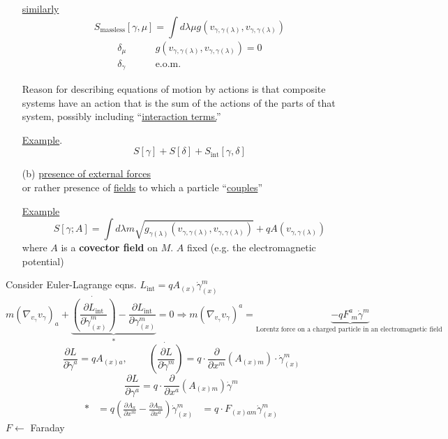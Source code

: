 \documentclass[10pt, twoside]{amsart}
\begin{document}
\begin{multicols*}{2}
\begin{enumerate}
\underline{similarly}
\[
S_{\text{massless}}[\gamma,\mu] = \int d\lambda \mu g(v_{\gamma, \gamma(\lambda)} , v_{\gamma,\gamma(\lambda)} )
\]
\[
\begin{aligned}
  \delta_{\mu}  \quad \quad \, & g(v_{\gamma,\gamma(\lambda)}, v_{\gamma,\gamma(\lambda) } ) = 0 \\
 \delta_{\gamma} \quad \quad \, & \text{e.o.m.}
\end{aligned}
\]

Reason for describing equations of motion by actions is that composite systems have an action that is the sum of the actions of the parts of that system, possibly including ``\underline{interaction terms.}''

\underline{Example}. \[
S[\gamma] + S[\delta] + S_{\text{int}}[\gamma,\delta]
\]
\item[(b)] \underline{presence of external forces} \\
or rather presence of \underline{fields} to which a particle ``\underline{couples}''

\underline{Example}
\[
S[\gamma;A] = \int d\lambda m \sqrt{ g_{\gamma(\lambda)}(v_{\gamma, \gamma(\lambda)}, v_{\gamma,\gamma(\lambda)} ) } + qA(v_{\gamma,\gamma(\lambda)})
\]
where $A$ is a \textbf{covector field} on $M$. $A$ fixed
(e.g. the electromagnetic potential)
\end{enumerate}

Consider Euler-Lagrange eqns. $L_{\text{int}} = q A_{(x)} \dot{\gamma}^m_{(x)}$
\[
m (\nabla_{v_{\gamma}} v_{\gamma})_a + \underbrace{ \dot{ \left( \frac{ \partial L_{\text{int}} }{ \partial \dot{\gamma}^m_{(x)} } \right) }- \frac{ \partial L_{\text{int}} }{ \partial \gamma^m_{(x)} } }_{*} = 0  \Longrightarrow \boxed{ m (\nabla_{v_{\gamma} } v_{\gamma})^a = \underbrace{ -q F^a_{ \, \, m } \dot{\gamma}^m }_{\text{Lorentz force on a charged particle in an electromagnetic field } } }
\]
\[
\frac{ \partial L}{ \partial \dot{\gamma}^a} = qA_{(x)a}, \quad \quad \, \dot{ \left( \frac{ \partial L}{ \partial \dot{\gamma}^m} \right) } = q \cdot \frac{ \partial }{ \partial x^m} (A_{(x)m} ) \cdot \dot{\gamma}^m_{(x)}
\]
\[
\frac{ \partial L}{ \partial \gamma^a} = q \cdot \frac{ \partial }{ \partial x^a} (A_{(x)m} ) \dot{\gamma}^m
\]
\[
\begin{aligned}
* & = q\left( \frac{ \partial A_a}{ \partial x^m} - \frac{ \partial A_m}{ \partial x^a} \right) \dot{\gamma}^m_{(x)}
& = q \cdot F_{(x)am} \dot{\gamma}^m_{(x)}
\end{aligned}
\]
$F \leftarrow $ Faraday


\end{multicols*}
\end{document}
